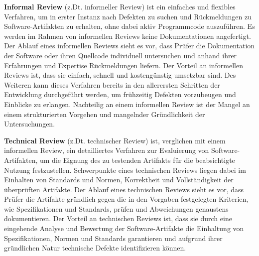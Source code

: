 \textbf{Informal Review} (z.Dt. informeller Review) ist ein einfaches und flexibles Verfahren, um in erster Instanz nach Defekten zu suchen und Rückmeldungen zu Software-Artifakten zu erhalten, ohne dabei aktiv Programmcode auszuführen.
Es werden im Rahmen von informellen Reviews keine Dokumentationen angefertigt.
Der Ablauf eines informellen Reviews sieht es vor, dass Prüfer die Dokumentation der Software oder ihren Quellcode individuell untersuchen und anhand ihrer Erfahrungen und Expertise Rückmeldungen liefern.
Der Vorteil an informellen Reviews ist, dass sie einfach, schnell und kostengünstig umsetzbar sind.
Des Weiteren kann dieses Verfahren bereits in den allerersten Schritten der Entwicklung durchgeführt werden, um frühzeitig Defekten vorzubeugen und Einblicke zu erlangen.
Nachteilig an einem informellen Review ist der Mangel an einem strukturierten Vorgehen und mangelnder Gründlichkeit der Untersuchungen.

\textbf{Technical Review} (z.Dt. technischer Review) ist, verglichen mit einem informellen Review, ein detailliertes Verfahren zur Evaluierung von Software-Artifakten, um die Eignung des zu testenden Artifakts für die beabsichtigte Nutzung festzustellen.
Schwerpunkte eines technischen Reviews liegen dabei im Einhalten von Standards und Normen, Korrektheit und Vollständigkeit der überprüften Artifakte.
Der Ablauf eines technischen Reviews sieht es vor, dass Prüfer die Artifakte gründlich gegen die in den Vorgaben festgelegten Kriterien, wie Spezifikationen und Standards, prüfen und Abweichungen genaustens dokumentieren.
Der Vorteil an technischen Reviews ist, dass sie durch eine eingehende Analyse und Bewertung der Software-Artifakte die Einhaltung von Spezifikationen, Normen und Standards garantieren und aufgrund ihrer gründlichen Natur technische Defekte identifizieren können.

